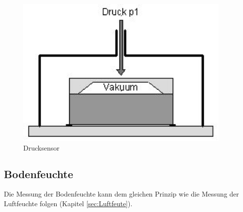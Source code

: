 \begin{figure}
\includegraphics[scale=0.5]{bilder/drucksensor} 
\caption[Drucksensor]{Drucksensor}
\label{Drucksensor}
\end{figure}

\cite{Firstsensor}

\subsection{Bodenfeuchte}
Die Messung der Bodenfeuchte kann dem gleichen Prinzip wie die Messung der Luftfeuchte folgen (Kapitel \ref{sec:Luftfeute}). 


 

